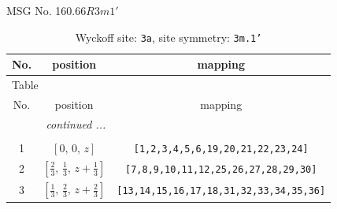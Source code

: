 \documentclass[fleqn,8pt]{jsarticle}
\begin{document}
\setcounter{MaxMatrixCols}{32}

\renewcommand{\tablename}{Table~}
\renewcommand{\figurename}{Figure~}
\begin{center}
\LARGE
MSG No. 160.66\quad$R3m1'$
\end{center}
\renewcommand{\arraystretch}{1.2}
\begin{longtable}{ccc}
\caption{Wyckoff site: {\tt 3a}, site symmetry: {\tt 3m.1'}}
 \\
 \hline \hline
No. & position & mapping \\ \hline \endfirsthead

\multicolumn{2}{l}{\tablename\ \thetable{}} \\
 \hline \hline
No. & position & mapping \\ \hline \endhead

 \hline \hline
\multicolumn{2}{r}{\footnotesize\it continued ...} \\ \endfoot

 \hline \hline
\multicolumn{2}{r}{} \\ \endlastfoot

1 & $\left[ 0,\, 0,\, z \right]$ & {\tt [1,2,3,4,5,6,19,20,21,22,23,24]} \\ \hline
2 & $\left[ \frac{2}{3},\, \frac{1}{3},\, z + \frac{1}{3} \right]$ & {\tt [7,8,9,10,11,12,25,26,27,28,29,30]} \\ \hline
3 & $\left[ \frac{1}{3},\, \frac{2}{3},\, z + \frac{2}{3} \right]$ & {\tt [13,14,15,16,17,18,31,32,33,34,35,36]} \\
\end{longtable}
\renewcommand{\arraystretch}{1.2}
\end{document}
